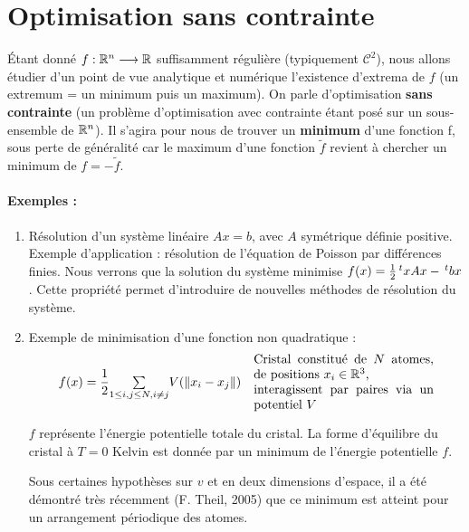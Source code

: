 \chapter{Optimisation sans contrainte}

Étant donné $f : \mathbb{R}^n \longrightarrow \mathbb{R}$ suffisamment régulière (typiquement
$\mathcal{C}^2$), nous allons étudier d'un point de vue analytique et
numérique l'existence d'extrema de $f$ (un extremum = un minimum puis un
maximum). On parle d'optimisation \textbf{sans contrainte} (un problème 
d'optimisation avec contrainte étant posé sur un sous-ensemble de $\mathbb{R}^n$).
Il s'agira pour nous de trouver un \textbf{minimum} d'une fonction f, sous perte
de généralité car le maximum d'une fonction $\tilde{f}$ revient à chercher
un minimum de $f = - \tilde{f}$.

\subsubsection*{Exemples :}

\begin{enumerate}[label=-]
    \item Résolution d'un système linéaire $Ax=b$, avec $A$ symétrique définie
        positive. Exemple d'application : résolution de l'équation de Poisson
        par différences finies. Nous verrons que la solution du système
        minimise $f(x) = \frac{1}{2} \,^txAx - \,^tbx$. Cette propriété
        permet d'introduire de nouvelles méthodes de résolution du système.

    \item Exemple de minimisation d'une fonction non quadratique :
        \[
            \begin{array}{cc}
                f(x) = \dfrac{1}{2} \underset{1\leq i,j\leq N, i\ne j}{\sum} V(\norm{x_i - x_j}) 
                & 
                \parbox{5cm}{Cristal constitué de $N$ atomes, de positions $x_i \in \R^3$,\\ interagissent par paires via un potentiel $V$}
            \end{array}
        \]
        
        $f$ représente l'énergie potentielle totale du cristal. La forme d'équilibre du
        cristal à $T = 0$ Kelvin est donnée par un minimum de l'énergie potentielle $f$.

        Sous certaines hypothèses sur $v$ et en deux dimensions d'espace, il a été démontré
        très récemment (F. Theil, 2005) que ce minimum est atteint pour un arrangement
        périodique des atomes.
\end{enumerate}

